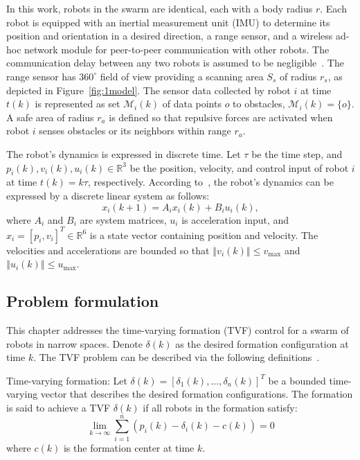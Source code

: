In this work, robots in the swarm are identical, each with a body radius $r$. Each robot is equipped with an inertial measurement unit (IMU) to determine its position and orientation in a desired direction, a range sensor, and a wireless ad-hoc network module for peer-to-peer communication with other robots. The communication delay between any two robots is assumed to be negligible~\cite{AlonsoMora2018,9527169}. The range sensor has $360^\circ$ field of view providing a scanning area $S_s$ of radius $r_s$, as depicted in Figure~\ref{fig:1model}. The sensor data collected by robot $i$ at time $t(k)$ is represented as set $\mathcal{M}_i(k)$ of data points $o$ to obstacles, $\mathcal{M}_i(k) = \{o\}$. A safe area of radius $r_a$ is defined so that repulsive forces are activated when robot $i$ senses obstacles or its neighbors within range $r_a$.

The robot's dynamics is expressed in discrete time. Let $\tau$ be the time step, and $p_i(k), v_i(k), u_i(k) \in \mathbb{R}^3$  be the position, velocity, and control input of robot $i$ at time $t(k) = k\tau$, respectively. According to~\cite{Dong2015}, the robot's dynamics can be expressed by a discrete linear system as follows:
\begin{equation}
    x_i(k+1)=A_ix_i(k) + B_iu_i(k),
    \label{eqn:1model}
\end{equation}
where $A_i$ and $B_i$ are system matrices, $u_i$ is  acceleration input, and  $x_i=\left[p_i,v_i\right]^T\in\mathbb{R}^6$ is a state vector containing position and velocity. The velocities and accelerations are bounded so that $\left\Vert v_i(k)\right\Vert\leq v_\text{max}$ and $\left\Vert u_i(k)\right\Vert\leq u_\text{max}$.

\subsection{Problem formulation}

This chapter addresses the time-varying formation (TVF) control for a swarm of robots in narrow spaces. Denote $\delta(k)$ as the desired formation configuration at time $k$. The TVF problem can be described via the following definitions~\cite{Dong2015,Dong2016}.

\begin{definition}\label{def_tvf}
Time-varying formation:  Let $\delta(k)=\left[\delta_1(k),...,\delta_n(k)\right]^T$ be a bounded time-varying vector that describes the desired formation configurations. The formation is said to achieve a TVF $\delta(k)$ if all robots in the formation satisfy:
\begin{equation}
    \lim_{k\to\infty}\sum_{i=1}^n\left( p_i(k)-\delta_i(k)-c(k)\right)=0
\end{equation}
where $c(k)$ is the formation center at time $k$.
\end{definition}

